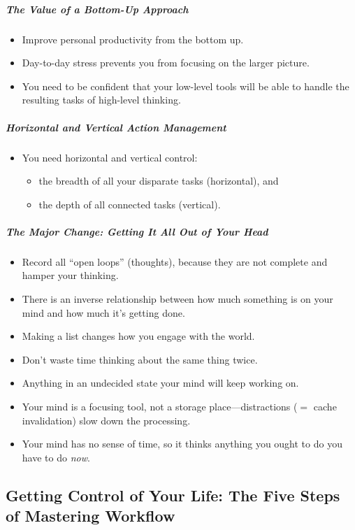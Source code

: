 \documentclass{article}
\begin{document}
\subparagraph{The Value of a Bottom-Up Approach}

\begin{itemize}
  \item Improve personal productivity from the bottom up.
  \item Day-to-day stress prevents you from focusing on the larger picture.
  \item You need to be confident that your low-level tools will be able to handle the resulting tasks of high-level thinking.
\end{itemize}

\subparagraph{Horizontal and Vertical Action Management}

\begin{itemize}
  \item You need horizontal and vertical control:
  \begin{itemize}
    \item the breadth of all your disparate tasks (horizontal), and
    \item the depth of all connected tasks (vertical).
  \end{itemize}
\end{itemize}

\subparagraph{The Major Change: Getting It All Out of Your Head}

\begin{itemize}
  \item Record all ``open loops'' (thoughts), because they are not complete and hamper your thinking.
  \item There is an inverse relationship between how much something is on your mind and how much it's getting done.
  \item Making a list changes how you engage with the world.
  \item Don't waste time thinking about the same thing twice.
  \item Anything in an undecided state your mind will keep working on.
  \item Your mind is a focusing tool, not a storage place---distractions ($=$ cache invalidation) slow down the processing.
  \item Your mind has no sense of time, so it thinks anything you ought to do you have to do \emph{now}.
\end{itemize}

\subsection{Getting Control of Your Life: The Five Steps of Mastering Workflow}
\end{document}
